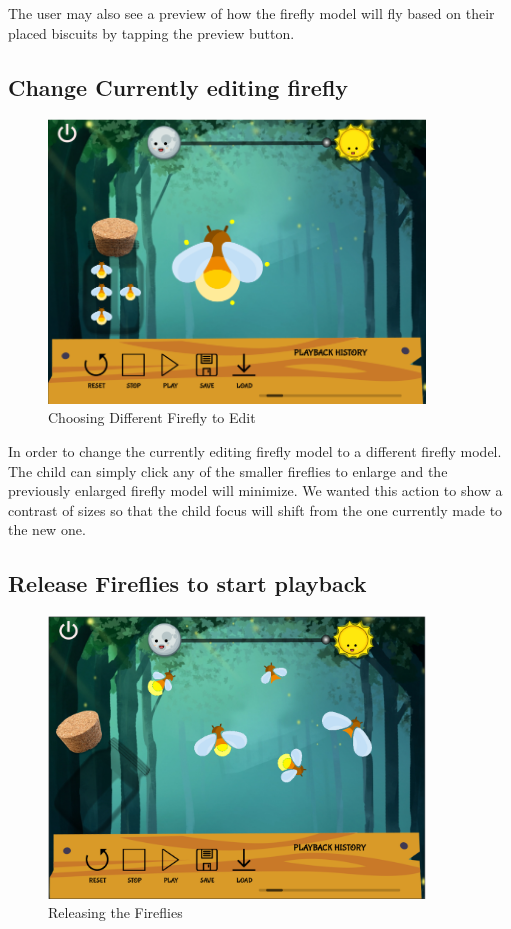 The user may also see a preview of how the firefly model will fly based on their placed biscuits by tapping the preview button.

\subsection{Change Currently editing firefly}

\begin{figure}[H]
    \centering
    \includegraphics[width=10cm]{figures/ChangeFirefly.png}
    \caption{Choosing Different Firefly to Edit}
    \label{fig:firefly2}
\end{figure}

In order to change the currently editing firefly model to a different firefly model. The child can simply click any of the smaller fireflies to enlarge and the previously enlarged firefly model will minimize. We wanted this action to show a contrast of sizes so that the child focus will shift from the one currently made to the new one.

\subsection{Release Fireflies to start playback}

\begin{figure}[H]
    \centering
    \includegraphics[width=10cm]{figures/Release.png}
    \caption{Releasing the Fireflies}
    \label{fig:releaseFirefly}
\end{figure}

